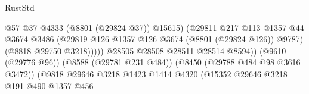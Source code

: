 \begin{lexlean}{RustStd}
\begin{coremodule}
                                                            @57
                                                            @37
                                                            @4333
                                                            (@8801 (@29824 @37))
                                                            @15615)
                                                          (@29811
                                                            @217
                                                            @113
                                                            @1357
                                                            @44
                                                            @3674
                                                            @3486
                                                            (@29819
                                                              @126
                                                              @1357
                                                              @126
                                                              @3674
                                                              (@8801 (@29824 @126))
                                                              @9787)
                                                            (@8818 @29750 @3218)))))
                                                    @28505
                                                    @28508
                                                    @28511
                                                    @28514
                                                    @8594))
                                                (@9610 (@29776 @96))
                                                (@8588 (@29781 @231 @484))
                                                (@8450 (@29788 @484 @98 @3616 @3472))
                                                (@9818
                                                  @29646
                                                  @3218
                                                  @1423
                                                  @1414
                                                  @4320
                                                  (@15352
                                                    @29646
                                                    @3218
                                                    @191
                                                    @490
                                                    @1357
                                                    @456

\end{coremodule}
\end{lexlean}

